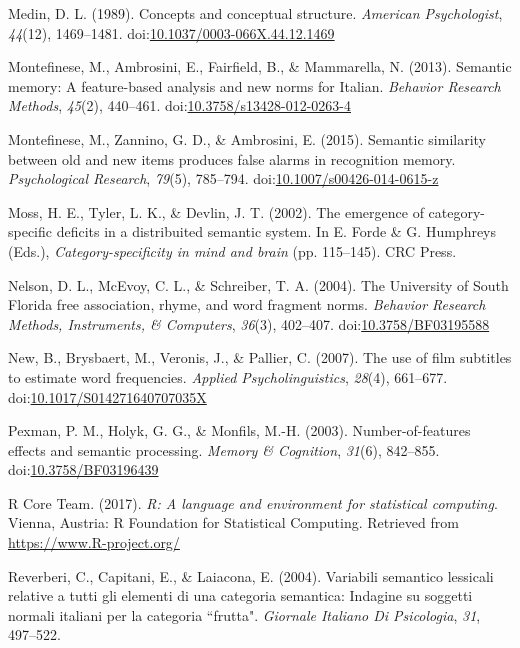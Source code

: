 \documentclass[english,man]{apa6}
\theoremstyle{definition}
\theoremstyle{definition}
\theoremstyle{definition}
\theoremstyle{remark}
\begin{document}
\hypertarget{ref-Medin1989}{}
Medin, D. L. (1989). Concepts and conceptual structure. \emph{American
Psychologist}, \emph{44}(12), 1469--1481.
doi:\href{https://doi.org/10.1037/0003-066X.44.12.1469}{10.1037/0003-066X.44.12.1469}

\hypertarget{ref-Montefinese2013}{}
Montefinese, M., Ambrosini, E., Fairfield, B., \& Mammarella, N. (2013).
Semantic memory: A feature-based analysis and new norms for Italian.
\emph{Behavior Research Methods}, \emph{45}(2), 440--461.
doi:\href{https://doi.org/10.3758/s13428-012-0263-4}{10.3758/s13428-012-0263-4}

\hypertarget{ref-Montefinese2015}{}
Montefinese, M., Zannino, G. D., \& Ambrosini, E. (2015). Semantic
similarity between old and new items produces false alarms in
recognition memory. \emph{Psychological Research}, \emph{79}(5),
785--794.
doi:\href{https://doi.org/10.1007/s00426-014-0615-z}{10.1007/s00426-014-0615-z}

\hypertarget{ref-Moss2002}{}
Moss, H. E., Tyler, L. K., \& Devlin, J. T. (2002). The emergence of
category-specific deficits in a distribuited semantic system. In E.
Forde \& G. Humphreys (Eds.), \emph{Category-specificity in mind and
brain} (pp. 115--145). CRC Press.

\hypertarget{ref-Nelson2004}{}
Nelson, D. L., McEvoy, C. L., \& Schreiber, T. A. (2004). The University
of South Florida free association, rhyme, and word fragment norms.
\emph{Behavior Research Methods, Instruments, \& Computers},
\emph{36}(3), 402--407.
doi:\href{https://doi.org/10.3758/BF03195588}{10.3758/BF03195588}

\hypertarget{ref-New2007}{}
New, B., Brysbaert, M., Veronis, J., \& Pallier, C. (2007). The use of
film subtitles to estimate word frequencies. \emph{Applied
Psycholinguistics}, \emph{28}(4), 661--677.
doi:\href{https://doi.org/10.1017/S014271640707035X}{10.1017/S014271640707035X}

\hypertarget{ref-Pexman2003}{}
Pexman, P. M., Holyk, G. G., \& Monfils, M.-H. (2003).
Number-of-features effects and semantic processing. \emph{Memory \&
Cognition}, \emph{31}(6), 842--855.
doi:\href{https://doi.org/10.3758/BF03196439}{10.3758/BF03196439}

\hypertarget{ref-R-base}{}
R Core Team. (2017). \emph{R: A language and environment for statistical
computing}. Vienna, Austria: R Foundation for Statistical Computing.
Retrieved from \url{https://www.R-project.org/}

\hypertarget{ref-Reverberi2004}{}
Reverberi, C., Capitani, E., \& Laiacona, E. (2004). Variabili semantico
lessicali relative a tutti gli elementi di una categoria semantica:
Indagine su soggetti normali italiani per la categoria ``frutta".
\emph{Giornale Italiano Di Psicologia}, \emph{31}, 497--522.
\end{document}

